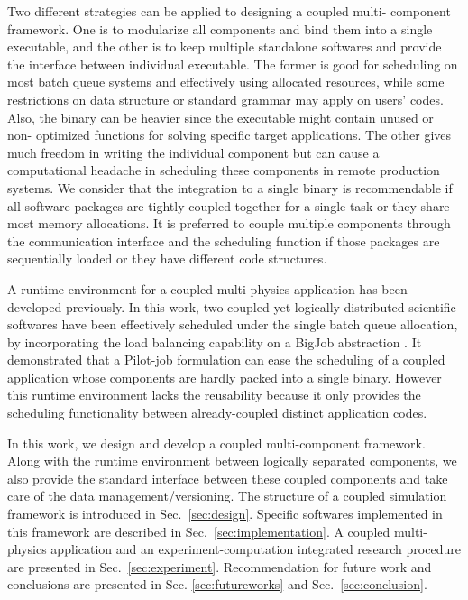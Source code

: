 \documentclass[10pt,conference]{IEEEtran}
\begin{document}
Two different strategies can be applied to designing a coupled multi-
component framework. One is to modularize all components and bind them 
into a single executable, and the other is to keep multiple standalone 
softwares and provide the interface between individual executable. The 
former is good for scheduling on most batch queue systems and 
effectively using allocated resources, while some restrictions on data 
structure or standard grammar may apply on users' codes. Also, the 
binary can be heavier since the executable might contain unused or non-
optimized functions for solving specific target applications. The other 
gives much freedom in writing the individual component but can cause a 
computational headache in scheduling these components in remote 
production systems. We consider that the integration to a single binary 
is recommendable if all software packages are tightly coupled together 
for a single task or they share most memory allocations. It is 
preferred to couple multiple components through the communication 
interface and the scheduling function if those packages are 
sequentially loaded or they have different code structures.

A runtime environment for a coupled multi-physics application 
\cite{CCGrid_Hybrid} has been developed previously. In this work, two 
coupled yet logically distributed scientific softwares have been 
effectively scheduled under the single batch queue allocation, by 
incorporating the load balancing capability on a BigJob abstraction 
\cite{repex_ptrsa}. It demonstrated that a Pilot-job formulation can 
ease the scheduling of a coupled application whose components are 
hardly packed into a single binary. However this runtime environment 
lacks the reusability because it only provides the scheduling 
functionality between already-coupled distinct application codes.

In this work, we design and develop a coupled multi-component 
framework. Along with the runtime environment between logically 
separated components, we also provide the standard interface between 
these coupled components and take care of the data 
management/versioning. The structure of a coupled simulation framework 
is introduced in Sec.~\ref{sec:design}. Specific softwares implemented in this framework are described in Sec.~\ref{sec:implementation}. A 
coupled multi-physics application and an experiment-computation 
integrated research procedure are presented in Sec.~\ref{sec:experiment}. 
Recommendation for future work and conclusions are presented in Sec. 
\ref{sec:futureworks} and Sec.~\ref{sec:conclusion}.
\end{document}
